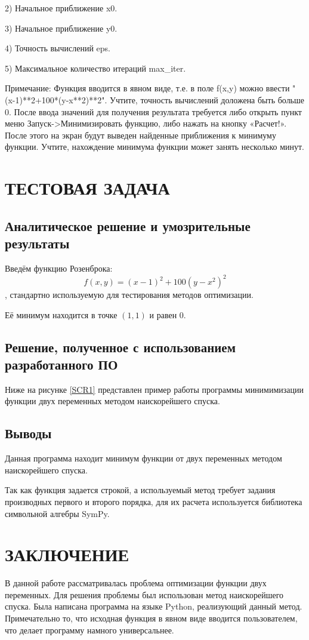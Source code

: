 2) Начальное приближение x0.

3) Начальное приближение y0.

4) Точность вычислений eps.

5) Максимальное количество итераций max\_iter.

Примечание: Функция вводится в явном виде, т.е. в поле f(x,y) можно ввести "(x-1)**2+100*(y-x**2)**2". Учтите, точность вычислений доложена быть больше 0.
После ввода значений для получения результата требуется либо открыть пункт меню  Запуск->Минимизировать функцию, либо нажать на кнопку «Расчет!». После этого на экран будут выведен найденные приближения к минимуму функции. Учтите, нахождение минимума функции может занять несколько минут.

\section{ТЕСТОВАЯ ЗАДАЧА}
\subsection{Аналитическое решение и умозрительные результаты}
Введём функцию Розенброка: $$f(x,y)=(x-1)^2+100(y-x^2)^2$$, стандартно используемую для тестирования методов оптимизации.

Её минимум находится в точке $(1,1)$ и равен 0.
\subsection{Решение, полученное с использованием разработанного ПО}
Ниже на рисунке \ref{SCR1} представлен пример работы программы  минимимизации функции двух переменных методом наискорейшего спуска.
\subsection{Выводы}
Данная программа находит минимум функции от двух переменных методом наискорейшего спуска. 

Так как функция задается строкой, а используемый метод требует задания производных первого и второго порядка, для их расчета используется библиотека символьной алгебры SymPy.
\section*{ЗАКЛЮЧЕНИЕ}
В данной работе рассматривалась проблема оптимизации функции двух переменных. Для решения проблемы был использован метод наискорейшего спуска. Была написана программа на языке Python, реализующий данный метод. Примечательно то, что исходная функция в явном виде вводится пользователем, что делает программу намного универсальнее.
